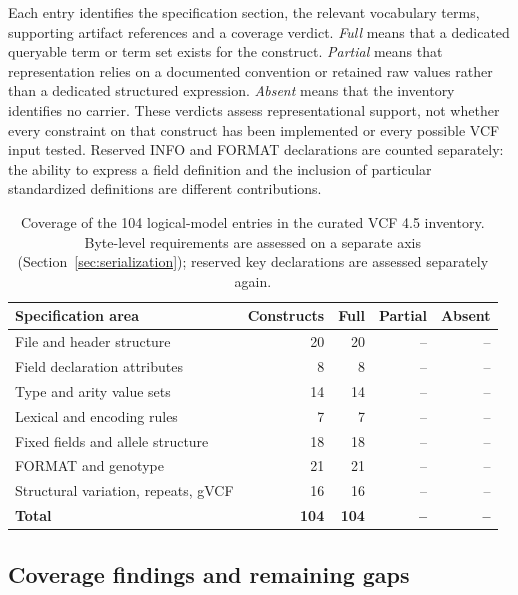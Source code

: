 \documentclass{ceurart}
\begin{document}
Each entry identifies the specification section, the relevant vocabulary terms, supporting artifact references and a coverage verdict. \emph{Full} means that a dedicated queryable term or term set exists for the construct. \emph{Partial} means that representation relies on a documented convention or retained raw values rather than a dedicated structured expression. \emph{Absent} means that the inventory identifies no carrier. These verdicts assess representational support, not whether every constraint on that construct has been implemented or every possible VCF input tested. Reserved INFO and FORMAT declarations are counted separately: the ability to express a field definition and the inclusion of particular standardized definitions are different contributions.

\begin{table}[t]
\caption{Coverage of the 104 logical-model entries in the curated VCF 4.5 inventory. Byte-level requirements are assessed on a separate axis (Section~\ref{sec:serialization}); reserved key declarations are assessed separately again.}
\label{tab:coverage}
\centering\small
\begin{tabularx}{\linewidth}{@{}Xrrrr@{}}
\hline
Specification area & Constructs & Full & Partial & Absent \\
\hline
File and header structure & 20 & 20 & -- & -- \\
Field declaration attributes & 8 & 8 & -- & -- \\
Type and arity value sets & 14 & 14 & -- & -- \\
Lexical and encoding rules & 7 & 7 & -- & -- \\
Fixed fields and allele structure & 18 & 18 & -- & -- \\
FORMAT and genotype & 21 & 21 & -- & -- \\
Structural variation, repeats, gVCF & 16 & 16 & -- & -- \\
\hline
\textbf{Total} & \textbf{104} & \textbf{104} & \textbf{--} & \textbf{--} \\
\hline
\end{tabularx}
\end{table}

\subsection{Coverage findings and remaining gaps}
\end{document}
